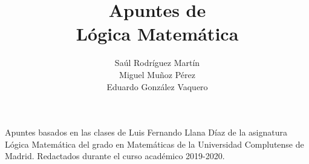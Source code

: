 \documentclass{report}
\theoremstyle{definition}
\theoremstyle{remark}
\numberwithin{section}{chapter}
\numberwithin{equation}{chapter}
\begin{document}
\title{Apuntes de\\ Lógica Matemática}


\author{Saúl Rodríguez Martín\\ Miguel Muñoz Pérez \\ Eduardo González Vaquero}

\maketitle




\cleardoublepage
\vspace*{13.5pc}
\begin{center}
  Apuntes basados en las clases de Luis Fernando Llana Díaz de la asignatura Lógica Matemática del grado en Matemáticas de la Universidad Complutense de Madrid. Redactados durante el curso académico 2019-2020.
\end{center}
\cleardoublepage


\tableofcontents
{}



\mainmatter




\appendix

\backmatter

\printindex
\end{document}
